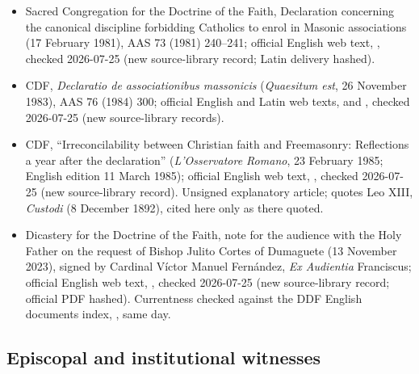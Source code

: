 {\fontsize{8.6}{9.6}\selectfont
\begin{itemize}[itemsep=0pt,parsep=0pt,topsep=0.05em]
\item Sacred Congregation for the Doctrine of the Faith, Declaration concerning the canonical discipline forbidding Catholics to enrol in Masonic associations (17 February 1981), AAS 73 (1981) 240--241; official English web text, , checked 2026-07-25 (new source-library record; Latin delivery hashed).
\item CDF, \emph{Declaratio de associationibus massonicis} (\emph{Quaesitum est}, 26 November 1983), AAS 76 (1984) 300; official English and Latin web texts,  and , checked 2026-07-25 (new source-library records).
\item CDF, ``Irreconcilability between Christian faith and Freemasonry: Reflections a year after the declaration'' (\emph{L'Osservatore Romano}, 23 February 1985; English edition 11 March 1985); official English web text, , checked 2026-07-25 (new source-library record). Unsigned explanatory article; quotes Leo XIII, \emph{Custodi} (8 December 1892), cited here only as there quoted.
\item Dicastery for the Doctrine of the Faith, note for the audience with the Holy Father on the request of Bishop Julito Cortes of Dumaguete (13 November 2023), signed by Cardinal V\'ictor Manuel Fern\'andez, \emph{Ex Audientia} Franciscus; official English web text, , checked 2026-07-25 (new source-library record; official PDF hashed). Currentness checked against the DDF English documents index, , same day.
\end{itemize}}

\subsection*{Episcopal and institutional witnesses}

